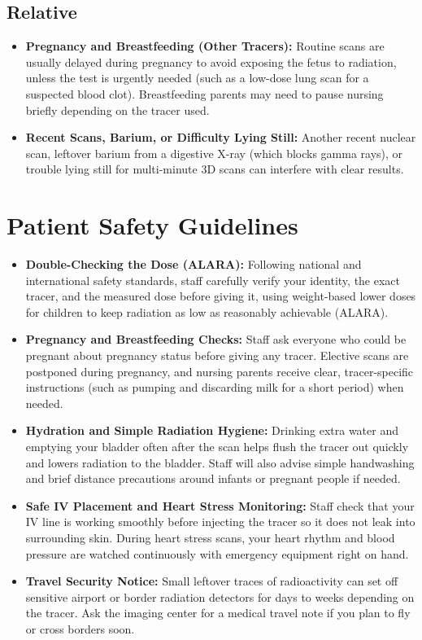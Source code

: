 \subsection{Relative}
\begin{itemize}
\item \textbf{Pregnancy and Breastfeeding (Other Tracers):} Routine scans are usually delayed during pregnancy to avoid exposing the fetus to radiation, unless the test is urgently needed (such as a low-dose lung scan for a suspected blood clot). Breastfeeding parents may need to pause nursing briefly depending on the tracer used.
\item \textbf{Recent Scans, Barium, or Difficulty Lying Still:} Another recent nuclear scan, leftover barium from a digestive X-ray (which blocks gamma rays), or trouble lying still for multi-minute 3D scans can interfere with clear results.
\end{itemize}

\section{Patient Safety Guidelines}
\begin{itemize}
\item \textbf{Double-Checking the Dose (ALARA):} Following national and international safety standards, staff carefully verify your identity, the exact tracer, and the measured dose before giving it, using weight-based lower doses for children to keep radiation as low as reasonably achievable (ALARA).
\item \textbf{Pregnancy and Breastfeeding Checks:} Staff ask everyone who could be pregnant about pregnancy status before giving any tracer. Elective scans are postponed during pregnancy, and nursing parents receive clear, tracer-specific instructions (such as pumping and discarding milk for a short period) when needed.
\item \textbf{Hydration and Simple Radiation Hygiene:} Drinking extra water and emptying your bladder often after the scan helps flush the tracer out quickly and lowers radiation to the bladder. Staff will also advise simple handwashing and brief distance precautions around infants or pregnant people if needed.
\item \textbf{Safe IV Placement and Heart Stress Monitoring:} Staff check that your IV line is working smoothly before injecting the tracer so it does not leak into surrounding skin. During heart stress scans, your heart rhythm and blood pressure are watched continuously with emergency equipment right on hand.
\item \textbf{Travel Security Notice:} Small leftover traces of radioactivity can set off sensitive airport or border radiation detectors for days to weeks depending on the tracer. Ask the imaging center for a medical travel note if you plan to fly or cross borders soon.
\end{itemize}

